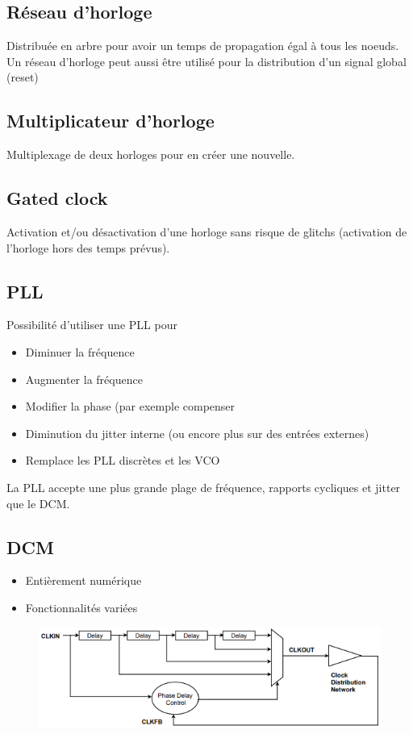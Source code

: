 \documentclass[resume]{subfiles}
\begin{document}
\subsection{Réseau d'horloge}
Distribuée en arbre pour avoir un temps de propagation égal à tous les noeuds. Un réseau d'horloge peut aussi être utilisé pour la distribution d'un signal global (reset)
\subsection{Multiplicateur d'horloge}
Multiplexage de deux horloges pour en créer une nouvelle.
\subsection{Gated clock}
Activation et/ou désactivation d'une horloge sans risque de glitchs (activation de l'horloge hors des temps prévus).
\subsection{PLL}
Possibilité d'utiliser une PLL pour
\begin{itemize}
\item Diminuer la fréquence
\item Augmenter la fréquence
\item Modifier la phase (par exemple compenser 
\end{itemize}
\begin{itemize}
\item Diminution du jitter interne (ou encore plus sur des entrées externes)
\item Remplace les PLL discrètes et les VCO
\end{itemize}
La PLL accepte une plus grande plage de fréquence, rapports cycliques et jitter que le DCM.
\subsection{DCM}
\begin{itemize}
\item Entièrement numérique
\item Fonctionnalités variées
\end{itemize}
\begin{figure}[H]
\centering
\includegraphics[width=\columnwidth]{img_6.png}
\end{figure}
\end{document}
